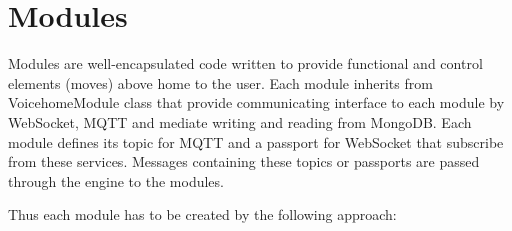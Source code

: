 \chapter{Modules} \label{chap:modules}


Modules are well-encapsulated code written to provide functional and control elements (moves) above home to the user. Each module inherits from VoicehomeModule class that provide communicating interface to each module by WebSocket, MQTT and mediate writing and reading from MongoDB. Each module defines its topic for MQTT and a passport for WebSocket that subscribe from these services. Messages containing these topics or passports are passed through the engine to the modules.

Thus each module has to be created by the following approach:


